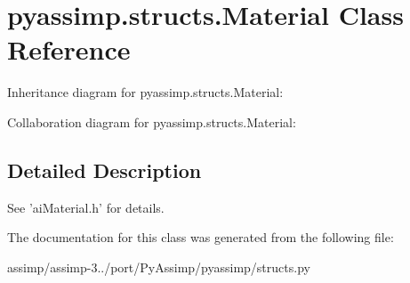 \hypertarget{classpyassimp_1_1structs_1_1_material}{\section{pyassimp.\+structs.\+Material Class Reference}
\label{classpyassimp_1_1structs_1_1_material}
}


Inheritance diagram for pyassimp.\+structs.\+Material\+:


Collaboration diagram for pyassimp.\+structs.\+Material\+:


\subsection{Detailed Description}
\begin{DoxyVerb}See 'aiMaterial.h' for details.
\end{DoxyVerb}
 

The documentation for this class was generated from the following file\+:\begin{DoxyCompactItemize}
\item 
assimp/assimp-\/3../port/\+Py\+Assimp/pyassimp/structs.\+py\end{DoxyCompactItemize}
